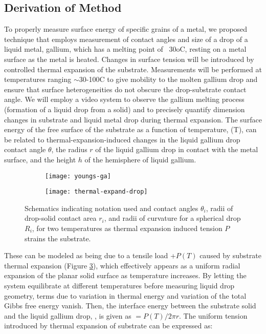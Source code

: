 
\subsection{Derivation of Method}

To properly measure surface energy of specific grains of a metal, we proposed technique that employs measurement of contact angles and size of a drop of a liquid metal, gallium, which has a melting point of ~30oC, resting on a metal surface as the metal is heated. Changes in surface tension will be introduced by controlled thermal expansion of the substrate. Measurements will be performed at temperatures ranging $\sim$30-100\degree C to give mobility to the molten gallium drop and ensure that surface heterogeneities do not obscure the drop-substrate contact angle. We will employ a video system to observe the gallium melting process (formation of a liquid drop from a solid) and to precisely quantify dimension changes in substrate and liquid metal drop during thermal expansion. The surface energy of the free surface of the substrate as a function of temperature, \gamSV(T), can be related to thermal-expansion-induced changes in the liquid gallium drop contact angle $\theta$, the radius $r$ of the liquid gallium drop in contact with the metal surface, and the height $h$ of the hemisphere of liquid gallium. 
\begin{figure}
	\centering
	\begin{subfigure}[b]{0.5\textwidth}
		\texttt{[image: youngs-ga]}
		\label{fig:youngs-ga}
	\end{subfigure}
	\begin{subfigure}[b]{0.5\textwidth}
		\texttt{[image: thermal-expand-drop]}
		\label{fig:thermal-expand-drop}
	\end{subfigure}
	\caption{Schematics indicating notation used and contact angles $\theta_{i}$, radii of drop-solid contact area $r_{i}$, and radii of curvature for a spherical drop $R_{i}$, for two temperatures as thermal expansion induced tension $P$ strains the substrate.}
	\label{fig:therm-exp-ga}
\end{figure}
These can be modeled as being due to a tensile load +$P(T)$ caused by substrate thermal expansion (Figure \ref{fig:therm-exp-ga}), which effectively appears as a uniform radial expansion of the planar solid surface as temperature increases. By letting the system equilibrate at different temperatures before measuring liquid drop geometry, terms due to variation in thermal energy and variation of the total Gibbs free energy vanish. Then, the interface energy between the substrate solid and the liquid gallium drop, \gamSL, is given as \gamSL$=P(T)/2\pi r$. The uniform tension introduced by thermal expansion of substrate can be expressed as:
